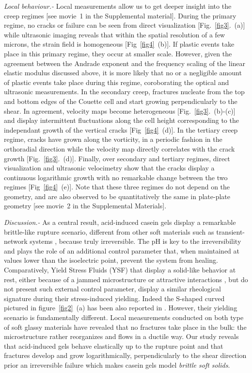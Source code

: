 \documentclass[twocolumn,superscriptaddress,showpacs,preprintnumbers,amsmath,amssymb,prl]{revtex4}
\begin{document}
\textit{Local behaviour.-} Local measurements allow us to get deeper insight into the creep regimes [see movie~1 in the Supplemental material]. During the primary regime, no cracks or failure can be seen from direct visualization [Fig.~\ref{fig3}.~(a)] while ultrasonic imaging reveals that within the spatial resolution of a few microns, the strain field is homogeneous [Fig~\ref{fig4}~(b)]. If plastic events take place in this primary regime, they occur at smaller scale. However, given the agreement between the Andrade exponent and the frequency scaling of the linear elastic modulus discussed above, it is more likely that no or a negligible amount of plastic events take place during this regime, coroborating the optical and ultrasonic measurements. 
In the secondary creep, fractures nucleate from the top and bottom edges of the Couette cell and start growing perpendicularly to the shear. In agreement, velocity maps become heterogeneous [Fig.~\ref{fig3}.~(b)-(c)] and display intermittent fluctuations along the cell height corresponding to the independant growth of the vertical cracks [Fig~\ref{fig4}~(d)]. 
In the tertiary creep regime, cracks have grown along the vorticity, in a periodic fashion in the orthoradial direction while the velocity map directly correlates with the crack growth [Fig.~\ref{fig3}.~(d)]. Finally, over secondary and tertiary regimes, direct visualization and ultrasonic velocimetry show that the cracks display a continuous logarithmic growth with no remarkable change between the two regimes [Fig~\ref{fig4}~(e)].
Note that these three regimes do not depend on the geometry, and are also observed to be quantitatively the same in plate-plate geometry [see movie~2 in the Supplemental Materials].

\textit{Discussion.-} As a central result, acid-induced casein gels display a remarkable brittle-like rupture scenario, different from other soft materials such as transient-network systems \cite{Ligoure:2013}, because truly irreversible. The pH is key to the irreversibility and plays the role of an additional control parameter that, when maintained at values lower than the isoelectric point, prevent the system from healing.
Comparatively, Yield Stress Fluids (YSF) that display a solid-like behavior at rest, either because of a jammed microstructure or attractive interactions \cite{Sciortino:2005,Bonnecaze:2010}, but do not present such external control parameter, display a similar rheological signature during their stress-induced yielding. Indeed the S-shaped curved pictured in figure~\ref{fig2}~(a) has been also reported in \cite{Bauer:2006,Gibaud:2010,Divoux:2011,Siebenburger:2012,Grenard:2013}. However, their yielding scenario is fundamentally different. Local measurements conducted on both type of soft glassy materials have revealed that no fractures take place in the bulk: the microstructure rather reorganizes and flows in a ductile way. Our study reveals that acid-induced gels behave elastically up to the rupture point and that fractures develop and grow logarithmically, perpendicularly to the shear direction prior an irreversible failure which makes casein gels model {\it brittle soft solids}.
\end{document}
